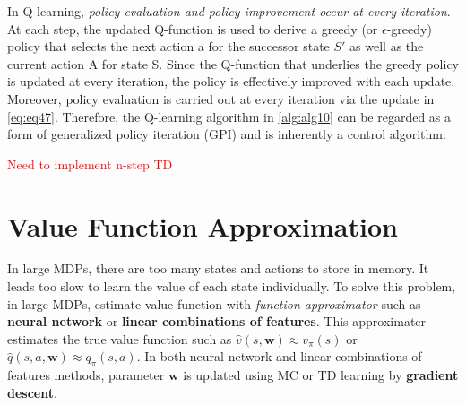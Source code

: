 \documentclass[
	10pt, %
]{article}
\theoremstyle{plain}
\newcommand{\mb}[1]{\mathbf{#1}}
\newcommand{\tb}[1]{\textbf{#1}}
\newcommand{\ti}[1]{\textit{#1}}
\numberwithin{equation}{subsection} %
\begin{document}
In Q-learning, \ti{policy evaluation and policy improvement occur at every iteration}. 
At each step, the updated Q-function is used to derive a greedy (or $\epsilon$-greedy) policy that selects the next action a for the successor state $S'$ as well as the current action A for state S. 
Since the Q-function that underlies the greedy policy is updated at every iteration, the policy is effectively improved with each update. 
Moreover, policy evaluation is carried out at every iteration via the update in \cref{eq:eq47}.
Therefore, the Q-learning algorithm in \cref{alg:alg10} can be regarded as a form of generalized policy iteration (GPI) and is inherently a control algorithm.

\textcolor{red}{Need to implement n-step TD}

\section{Value Function Approximation}
In large MDPs, there are too many states and actions to store in memory.
It leads too slow to learn the value of each state individually. 
To solve this problem, in large MDPs, estimate value function with \ti{function approximator} such as \tb{neural network} or \tb{linear combinations of features}. 
This approximater estimates the true value function such as $\hat{v}(s, \mb{w}) \approx v_\pi(s)$ or $\hat{q}(s,a,\mb{w}) \approx q_\pi(s,a)$.
In both neural network and linear combinations of features methods, parameter $\mb{w}$ is updated using MC or TD learning by \tb{gradient descent}.
\end{document}
